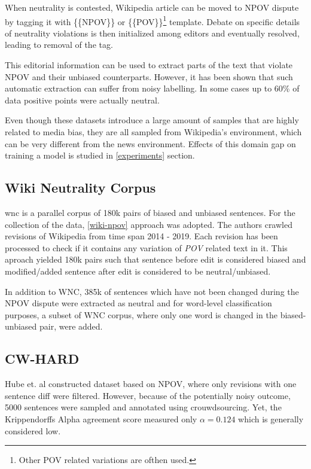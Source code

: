 When neutrality is contested, Wikipedia article can be moved to NPOV dispute by tagging it with \{\{NPOV\}\} or \{\{POV\}\}\footnote{Other POV related variations are ofthen used.} template. Debate on specific details of neutrality violations is then initialized among editors and eventually resolved, leading to removal of the tag.

This editorial information can be used to extract parts of the text that violate NPOV and their unbiased counterparts. However, it has been shown \cite{hube2019neural,zhong-etal-2021-wikibias-detecting} that such automatic extraction can suffer from noisy labelling. In some cases \cite{hube2019neural} up to 60\% of data positive points were actually neutral.

Even though these datasets introduce a large amount of samples that are highly related to media bias, they are all sampled from Wikipedia's environment, which can be very different from the news environment. Effects of this domain gap on training a model is studied in \ref{experiments} section.




\subsection{Wiki Neutrality Corpus}\label{wiki}
\Gls{wnc} \cite{pryzant2020automatically} is a parallel corpus of 180k pairs of biased and unbiased sentences. For the collection of the data, \ref{wiki-npov} approach was adopted. The authors crawled revisions of Wikipedia from time span 2014 - 2019. Each revision has been processed to check if it contains any variation of \textit{POV} related text in it. This aproach yielded 180k pairs such that sentence before edit is considered biased and modified/added sentence after edit is considered to be neutral/unbiased.
    
In addition to WNC, 385k of sentences which have not been changed during the NPOV dispute were extracted as neutral and for word-level classification purposes, a subset of WNC corpus, where only one word is changed in the biased-unbiased pair, were added.




\subsection{CW-HARD}
Hube et. al \cite{hube2019neural} constructed dataset based on NPOV, where only revisions with one sentence diff were filtered. However, because of the potentially noisy outcome, 5000 sentences were sampled and annotated using crouwdsourcing. Yet, the Krippendorffs Alpha agreement score measured only $\alpha = 0.124$ which is generally considered low. 

